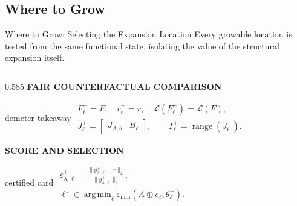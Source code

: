 \subsection{Where to Grow}

\begin{frame}[t]{Where to Grow: Selecting the Expansion Location}
  \vspace{-0.13cm}
  {\fontsize{7.35}{8.7}\selectfont
  Every growable location is tested from the same functional state, isolating
  the value of the structural expansion itself.}

  \vspace{0.09cm}
  \begin{columns}[T,onlytextwidth]
    \begin{column}{0.585\textwidth}
      {\color{EnstaBlue}\bfseries\scriptsize FAIR COUNTERFACTUAL COMPARISON}
      \vspace{0.03cm}

      \begin{beamercolorbox}[rounded=true,sep=0.10cm,wd=\linewidth]{demeter takeaway}
        \centering
        \fontsize{6.65}{7.9}\selectfont
        \(\displaystyle
          \begin{gathered}
            F_\ell^+=F,\quad r_\ell^+=r,\quad
            \mathcal L(F_\ell^+)=\mathcal L(F),\\[5pt]
            J_\ell^+=\begin{bmatrix}J_{A,\theta}&B_\ell\end{bmatrix},
            \qquad T_\ell^+=\operatorname{range}(J_\ell^+).
          \end{gathered}
        \)
      \end{beamercolorbox}

      \vspace{0.09cm}
      {\color{EnstaBlue}\bfseries\scriptsize SCORE AND SELECTION}
      \vspace{0.03cm}

      \begin{beamercolorbox}[rounded=true,sep=0.10cm,wd=\linewidth]{certified card}
        \centering
        \fontsize{6.75}{8.0}\selectfont
        \(\displaystyle
          \begin{gathered}
            \varepsilon_{\lambda,\ell}^+
            =\frac{\lVert g_{\lambda,\ell}^+-r\rVert_2}
                   {\lVert g_{\lambda,\ell}^+\rVert_2},\\[5pt]
            \ell^\star\in\operatorname*{arg\,min}_{\ell}
            \varepsilon_{\min}
            \!\left(A\oplus e_\ell,\theta_\ell^+\right).
          \end{gathered}
        \)
      \end{beamercolorbox}


\end{column}
\end{columns}
\end{frame}
